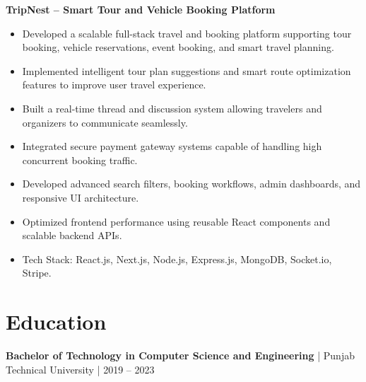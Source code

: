 \documentclass[10pt,a4paper]{article}
\begin{document}
\textbf{TripNest -- Smart Tour and Vehicle Booking Platform}
\begin{itemize}
  \item Developed a scalable full-stack travel and booking platform supporting tour booking, vehicle reservations, event booking, and smart travel planning.
  \item Implemented intelligent tour plan suggestions and smart route optimization features to improve user travel experience.
  \item Built a real-time thread and discussion system allowing travelers and organizers to communicate seamlessly.
  \item Integrated secure payment gateway systems capable of handling high concurrent booking traffic.
  \item Developed advanced search filters, booking workflows, admin dashboards, and responsive UI architecture.
  \item Optimized frontend performance using reusable React components and scalable backend APIs.
  \item Tech Stack: React.js, Next.js, Node.js, Express.js, MongoDB, Socket.io, Stripe.
\end{itemize}

\section*{Education}
\textbf{Bachelor of Technology in Computer Science and Engineering} | Punjab Technical University | 2019 -- 2023
\end{document}
